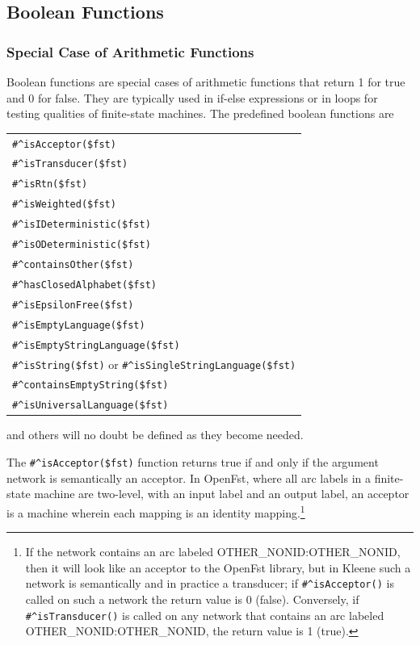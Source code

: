 \documentclass[letterpaper,12pt]{article}
\begin{document}
\vspace{0.5cm}

\subsection{Boolean Functions}

\subsubsection{Special Case of Arithmetic Functions}

Boolean functions are special cases of arithmetic functions that return 1 for true and 0 for false.  They
are typically used in if-else expressions or in loops for testing qualities of finite-state machines.
The predefined boolean functions are 

\vspace{0.5cm}

\noindent
\begin{tabular}{|l|}
\hline
\verb!#^isAcceptor($fst)! \\
\verb!#^isTransducer($fst)! \\
\verb!#^isRtn($fst)! \\
\hline
\verb!#^isWeighted($fst)! \\
\verb!#^isIDeterministic($fst)! \\
\verb!#^isODeterministic($fst)! \\
\verb!#^containsOther($fst)! \\
\verb!#^hasClosedAlphabet($fst)! \\
\verb!#^isEpsilonFree($fst)! \\
\hline
\verb!#^isEmptyLanguage($fst)! \\
\verb!#^isEmptyStringLanguage($fst)! \\
\verb!#^isString($fst)! or \verb!#^isSingleStringLanguage($fst)!\\
\verb!#^containsEmptyString($fst)! \\
\verb!#^isUniversalLanguage($fst)! \\
\hline
\end{tabular}

\vspace{0.5cm}
\noindent
and others will no doubt be defined as they become needed.

The \verb!#^isAcceptor($fst)! function returns true if and only if the
argument network is semantically an
acceptor.  In OpenFst, where all arc labels in a finite-state machine
are two-level, with an input label and an output label, an acceptor is a
machine wherein each mapping is an identity mapping.\footnote{If the network contains an arc labeled
OTHER\_NONID:OTHER\_NONID, then it will look like an acceptor to the OpenFst library, but in Kleene such
a network is semantically and in practice a transducer; if \verb!#^isAcceptor()! is called on such
a network the return value is 0 (false).  Conversely, if
\verb!#^isTransducer()! is called on any network that
contains an arc labeled OTHER\_NONID:OTHER\_NONID, the return value is 1 (true).}
\end{document}
